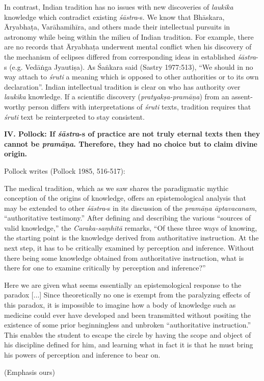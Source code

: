 In contrast, Indian tradition has no issues with new discoveries of {\sl laukika} knowledge which contradict existing {\sl śāstra}-s.  We know that Bhāskara, Āryabhaṭa, Varāhamihīra, and others made their intellectual pursuits in astronomy while being within the milieu of Indian tradition.  For example, there are no records that Āryabhaṭa underwent mental conflict when his discovery of the mechanism of eclipses differed from corresponding ideas in established {\sl śāstra}-s (e.g. Vedāṅga Jyautiṣa). As Śaṅkara said (Sastry 1977:513), ``We should in no way attach to {\sl śruti} a meaning which is opposed to other authorities or to its own declaration''. Indian intellectual tradition is clear on who has authority over {\sl laukika} knowledge.  If a scientific discovery ({\sl pratyakṣa-pramāṇa}) from an assent-worthy person differs with interpretations of {\sl śruti} texts, tradition requires that {\sl śruti} text be reinterpreted to stay consistent.

{\bf IV. Pollock: If {{\sl\bfseries śāstra}\relax}-s of practice are not truly eternal texts then they cannot be {{\sl\bfseries pramāṇa}\relax}.  Therefore, they had no choice but to claim divine origin.}

Pollock writes (Pollock 1985, 516-517):

\begin{myquote}
The medical tradition, which as we saw shares the paradigmatic mythic conception of the origins of knowledge, offers an epistemological analysis that may be extended to other {\sl śāstra}-s in its discussion of the {\sl pra\-māṇa āptavacanam}, ``authoritative testimony.''  After defining and describing the various ``sources of valid knowledge,'' the {\sl Caraka-saṃhitā} remarks, ``Of these three ways of knowing, the starting point is the knowledge derived from authoritative instruction. At the next step, it has to be critically examined by perception and inference. Without there being some knowledge obtained from authoritative instruction, what is there for one to examine critically by perception and inference?''

Here we are given what seems essentially an epistemological response to the paradox [...] Since theoretically no one is exempt from the paralyzing effects of this paradox, it is impossible to imagine how a body of knowledge such as medicine could ever have developed and been transmitted without positing the existence of some prior beginningless and unbroken ``authoritative instruction.'' This enables the student to escape the circle by having the scope and object of his discipline defined for him, and learning what in fact it is that he must bring his powers of perception and inference to bear on.

\hfill (Emphasis ours)
\end{myquote}

